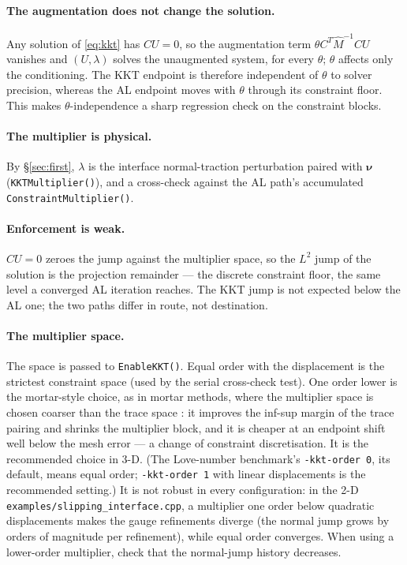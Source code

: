 \documentclass[11pt]{article}
\newcommand{\bnu}{\bm{\nu}}
\begin{document}
\paragraph{The augmentation does not change the solution.} Any solution
of \eqref{eq:kkt} has $CU = 0$, so the augmentation term
$\theta C^{T}\hat M^{-1}CU$ vanishes and $(U,\lambda)$ solves the
unaugmented system, for every $\theta$; $\theta$ affects only the
conditioning. The KKT endpoint is therefore independent of $\theta$ to
solver precision, whereas the AL endpoint moves with $\theta$ through
its constraint floor. This makes $\theta$-independence a sharp
regression check on the constraint blocks.

\paragraph{The multiplier is physical.} By \S\ref{sec:first}, $\lambda$
is the interface normal-traction perturbation paired with $\bnu$
(\texttt{KKTMultiplier()}), and a cross-check against the AL path's
accumulated \texttt{ConstraintMultiplier()}.

\paragraph{Enforcement is weak.} $CU = 0$ zeroes the jump against the
multiplier space, so the $L^2$ jump of the solution is the projection
remainder --- the discrete constraint floor, the same level a converged
AL iteration reaches. The KKT jump is not expected below the AL one; the
two paths differ in route, not destination.

\paragraph{The multiplier space.} The space is passed to
\texttt{EnableKKT()}. Equal order with the displacement is the
strictest constraint space (used by the serial cross-check test). One
order lower is the mortar-style choice, as in mortar methods, where the
multiplier space is chosen coarser than the trace space
\cite{Wohlmuth2001}: it improves the inf-sup margin of the trace
pairing and shrinks the multiplier block, and it is cheaper at an
endpoint shift well below the mesh error --- a change of constraint
discretisation. It is the recommended choice in 3-D. (The Love-number
benchmark's \texttt{-kkt-order 0}, its default, means equal order;
\texttt{-kkt-order 1} with linear displacements is the recommended
setting.) It is not robust in every configuration: in the 2-D
\texttt{examples/slipping\_interface.cpp}, a multiplier one order
below quadratic displacements makes the gauge refinements diverge (the
normal jump grows by orders of magnitude per refinement), while equal
order converges. When using a lower-order multiplier, check that the
normal-jump history decreases.
\end{document}
